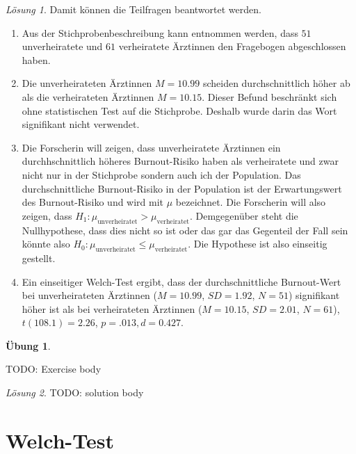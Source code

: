 \documentclass[
]{book}
\providecommand{\tightlist}{%
  \setlength{\itemsep}{0pt}\setlength{\parskip}{0pt}}
\theoremstyle{definition}
\theoremstyle{definition}
\theoremstyle{definition}
\newtheorem{exercise}{Übung}[chapter]
\theoremstyle{definition}
\theoremstyle{remark}
\newtheorem*{solution}{Lösung}
\begin{document}
\begin{solution}
Damit können die Teilfragen beantwortet werden.

\begin{enumerate}
\def\labelenumi{\alph{enumi})}
\tightlist
\item
  Aus der Stichprobenbeschreibung kann entnommen werden, dass \(51\) unverheiratete und \(61\) verheiratete Ärztinnen den Fragebogen abgeschlossen haben.
\item
  Die unverheirateten Ärztinnen \(M = 10.99\) scheiden durchschnittlich höher ab als die verheirateten Ärztinnen \(M = 10.15\). Dieser Befund beschränkt sich ohne statistischen Test auf die Stichprobe. Deshalb wurde darin das Wort signifikant nicht verwendet.
\item
  Die Forscherin will zeigen, dass unverheiratete Ärztinnen ein durchhschnittlich höheres Burnout-Risiko haben als verheiratete und zwar nicht nur in der Stichprobe sondern auch ich der Population. Das durchschnittliche Burnout-Risiko in der Population ist der Erwartungswert des Burnout-Risiko und wird mit \(\mu\) bezeichnet. Die Forscherin will also zeigen, dass \(H_1: \mu_\text{unverheiratet} > \mu_\text{verheiratet}\). Demgegenüber steht die Nullhypothese, dass dies nicht so ist oder das gar das Gegenteil der Fall sein könnte also \(H_0: \mu_\text{unverheiratet} \leq \mu_\text{verheiratet}\). Die Hypothese ist also einseitig gestellt.
\item
  Ein einseitiger Welch-Test ergibt, dass der durchschnittliche Burnout-Wert bei unverheirateten Ärztinnen (\(M = 10.99\), \(SD = 1.92\), \(N = 51\)) signifikant höher ist als bei verheirateten Ärztinnen (\(M = 10.15\), \(SD = 2.01\), \(N = 61\)), \(t(108.1) = 2.26\), \(p = .013, d = 0.427\).
\end{enumerate}

\end{solution}

\begin{exercise}
\protect\hypertarget{exr:tagname5}{}\label{exr:tagname5}\leavevmode

TODO: Exercise body

\end{exercise}

\begin{solution}
TODO: solution body
\end{solution}

\chapter{Welch-Test}\label{welch-test}
\end{document}
